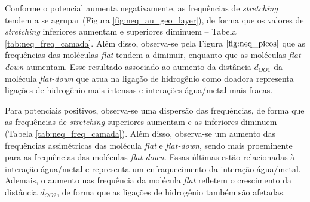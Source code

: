 Conforme o potencial aumenta negativamente, as frequências de \textit{stretching} tendem a se agrupar (Figura \ref{fig:neq_au_geo_layer}), de forma que os valores de \textit{stretching} inferiores aumentam e superiores diminuem -- Tabela \ref{tab:neq_freq_camada}. Além disso, observa-se pela Figura $\ref{fig:neq_picos}$ que as frequências das moléculas \textit{flat} tendem a diminuir, enquanto que as moléculas \textit{flat-down} aumentam. Esse resultado associado ao aumento da distância $ d_{OO1} $ da molécula \textit{flat-down} que atua na ligação de hidrogênio como doadora representa ligações de hidrogênio mais intensas e interações água/metal mais fracas. %


Para potenciais positivos, observa-se uma dispersão das frequências, de forma que as frequências de \textit{stretching} superiores aumentam e as inferiores diminuem (Tabela \ref{tab:neq_freq_camada}). Além disso, observa-se um aumento das frequências assimétricas das molécula \textit{flat} e \textit{flat-down}, sendo mais proeminente para as frequências das moléculas \textit{flat-down}. Essas últimas estão relacionadas à interação água/metal e representa um enfraquecimento da interação água/metal. Ademais, o aumento nas frequência da molécula \textit{flat} refletem o crescimento da distância $ d_{OO2} $, de forma que as ligações de hidrogênio também são afetadas. 

